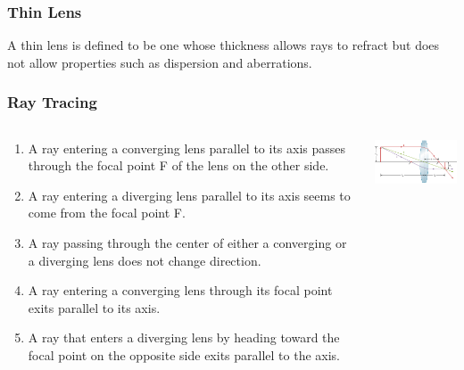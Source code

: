 \documentclass{beamer}
\begin{document}
\begin{frame}\frametitle{Thin Lens}
A thin lens is defined to be one whose thickness allows rays to refract but does not allow properties such as dispersion and aberrations.
\end{frame}

\begin{frame}\frametitle{Ray Tracing}
\begin{columns}
\begin{column}{7.4cm}
\begin{enumerate}
\item A ray entering a converging lens parallel to its axis passes through the focal point F of the lens on the other side.
\item A ray entering a diverging lens parallel to its axis seems to come from the focal point F.
\item A ray passing through the center of either a converging or a diverging lens does not change direction.
\item A ray entering a converging lens through its focal point exits parallel to its axis.
\item A ray that enters a diverging lens by heading toward the focal point on the opposite side exits parallel to the axis.
\end{enumerate}


\end{column}
\begin{column}{4.6cm}
\begin{center}
\includegraphics[width=4.5cm]{fig/raytrace.jpg}
\end{center}
\end{column}
\end{columns}
\end{frame}
\end{document}
